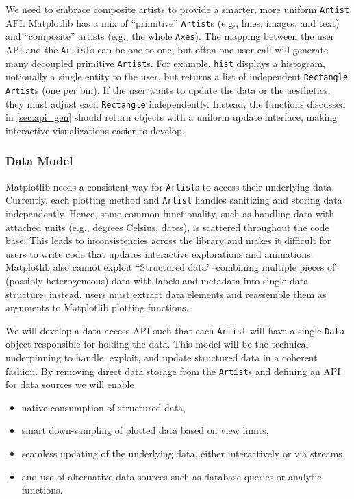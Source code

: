 \documentclass[11pt,letterpaper]{article}  %
\begin{document}
We need to embrace composite artists to provide a smarter, more uniform \texttt{Artist} API.
Matplotlib has a mix of ``primitive'' \texttt{Artist}s (e.g., lines, images, and text) and ``composite'' artists (e.g., the whole \texttt{Axes}). The mapping between the user API and the \texttt{Artist}s can be
one-to-one, but often one user call will generate many decoupled primitive \texttt{Artist}s.
For example, \texttt{hist} displays a histogram, notionally a single entity to the user,
but returns a list of independent \texttt{Rectangle} \texttt{Artist}s (one per bin).
If the user wants to update the data or the aesthetics, they must adjust each \texttt{Rectangle} independently.
Instead, the functions discussed in \ref{sec:api_gen} should return objects with
a uniform update interface, making interactive visualizations easier to develop.


\subsubsection{Data Model}
\label{sec:dm}
Matplotlib needs a consistent way for \texttt{Artist}s to access their underlying data. Currently, each plotting method and \texttt{Artist} handles sanitizing and storing data independently. Hence, some common functionality, such as handling data with attached units (e.g., degrees Celsius, dates), is scattered throughout the code base. This leads to inconsistencies across the library and makes it difficult for users to write code that updates interactive explorations and animations. Matplotlib also cannot exploit ``Structured data''--combining multiple pieces of (possibly heterogeneous) data with labels and metadata into single data structure; instead, users must extract data elements and reassemble them as arguments to Matplotlib plotting functions.

We will develop a data access API such that each \texttt{Artist} will have a single \texttt{Data} object responsible for holding the data. This model will be the technical underpinning to handle, exploit, and
update structured data in a coherent fashion. By removing direct data storage from the \texttt{Artist}s and defining an API for data sources we will enable

\begin{itemize}[noitemsep]
  \item native consumption of structured data,
  \item smart down-sampling of plotted data based on view limits,
  \item seamless updating of the underlying data, either interactively or via streams,
  \item and use of alternative data sources such as database queries or analytic functions.
\end{itemize}
\end{document}
